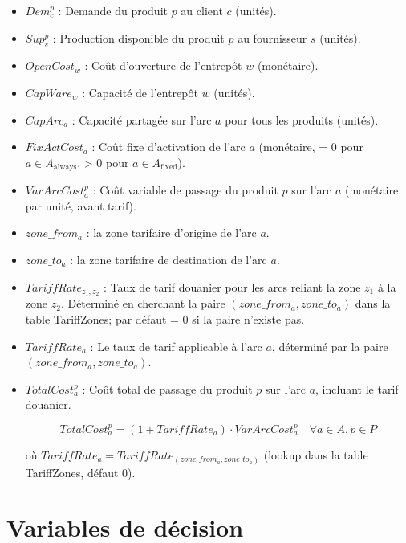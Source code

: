 \documentclass{article}
\begin{document}
\begin{itemize}
    \item $Dem_c^p$ : Demande du produit $p$ au client $c$ (unités).
    \item $Sup_s^p$ : Production disponible du produit $p$ au fournisseur $s$ (unités).
    \item $OpenCost_w$ : Coût d'ouverture de l'entrepôt $w$ (monétaire).
    \item $CapWare_w$ : Capacité de l'entrepôt $w$ (unités).
    \item $CapArc_a$ : Capacité partagée sur l'arc $a$ pour tous les produits (unités).
    \item $FixActCost_a$ : Coût fixe d'activation de l'arc $a$
    \quad (monétaire, = 0 pour $a \in A_{\text{always}}$, > 0 pour $a \in A_{\text{fixed}}$).
    \item $VarArcCost_a^p$ : Coût variable de passage du produit $p$ sur l'arc $a$ (monétaire par unité, avant tarif).
    \item $zone\_from_a$ : la zone tarifaire d'origine de l'arc $a$.
    \item $zone\_to_a$ : la zone tarifaire de destination de l'arc $a$.
    \item $TariffRate_{z_1, z_2}$ : Taux de tarif douanier pour les arcs reliant la zone $z_1$ à la zone $z_2$.
    \quad Déterminé en cherchant la paire $(zone\_from_a, zone\_to_a)$ dans la table TariffZones;
    \quad par défaut = 0 si la paire n'existe pas.
    \item $TariffRate_a$ : Le taux de tarif applicable à l'arc $a$, déterminé par la paire
    \quad $(zone\_from_a, zone\_to_a)$.
    \item $TotalCost_a^p$ : Coût total de passage du produit $p$ sur l'arc $a$, incluant le tarif douanier.

    \[
        TotalCost_a^p = (1 + TariffRate_a) \cdot VarArcCost_a^p \quad \forall a \in A, p \in P
    \]

    où $TariffRate_a = TariffRate_{(zone\_from_a, zone\_to_a)}$ (lookup dans la table TariffZones, défaut 0).

\end{itemize}

\section{Variables de décision}
\end{document}
